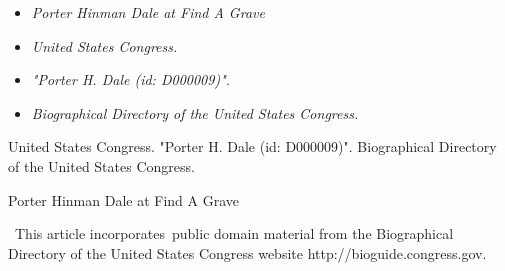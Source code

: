 \begin{itemize}
\item
  \emph{Porter Hinman Dale at Find A Grave}
\item
  \emph{United States Congress.}
\item
  \emph{"Porter H. Dale (id: D000009)".}
\item
  \emph{Biographical Directory of the United States Congress.}
\end{itemize}

United States Congress. "Porter H. Dale (id: D000009)". Biographical
Directory of the United States Congress.

Porter Hinman Dale at Find A Grave

~This article incorporates~public domain material from the Biographical
Directory of the United States Congress website
http://bioguide.congress.gov.
